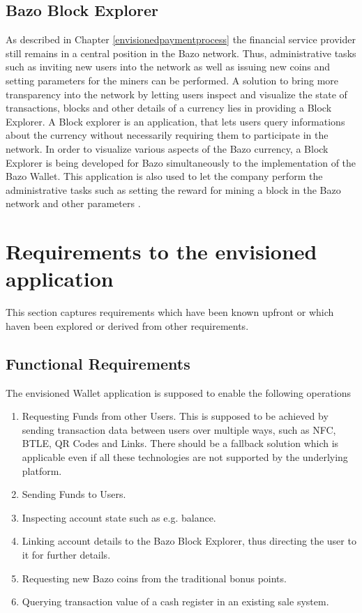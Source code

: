 \subsection{Bazo Block Explorer\label{bazoblockexplorer}}
As described in Chapter \ref{envisionedpaymentprocess} the financial service provider still remains in a central position in the Bazo network. Thus, administrative tasks such as inviting new users into the network as well as issuing new coins and setting
parameters for the miners can be performed.
A solution to bring more transparency into the network by letting users inspect and visualize the state of transactions, blocks and other details of a currency lies in providing a Block Explorer. A Block explorer is an application, that lets users query informations about the currency without necessarily requiring them to participate in the network.
In order to visualize various aspects of the Bazo currency, a Block Explorer is being developed for Bazo simultaneously to the implementation of the Bazo Wallet. This application is also used to let the company perform the administrative tasks such as setting the reward for mining a block in the Bazo network and other parameters \cite{bazoblockexplorer}.

\section{Requirements to the envisioned application}\label{requirements}
This section captures requirements which have been known upfront or which haven been explored or derived from other requirements. 
\subsection{Functional Requirements}\label{functionalreq}
The envisioned Wallet application is supposed to enable the following operations
\begin{enumerate}
\item Requesting Funds from other Users.
This is supposed to be achieved by sending transaction data between users over multiple ways, such as NFC, BTLE, QR Codes and Links. There should be a fallback solution which is applicable even if all these technologies are not supported by the underlying platform.
\item Sending Funds to Users.
\item Inspecting account state such as e.g. balance.
\item Linking account details to the Bazo Block Explorer, thus directing the user to it for further details.
\item Requesting new Bazo coins from the traditional bonus points.
\item Querying transaction value of a cash register in an existing sale system.


\end{enumerate}
